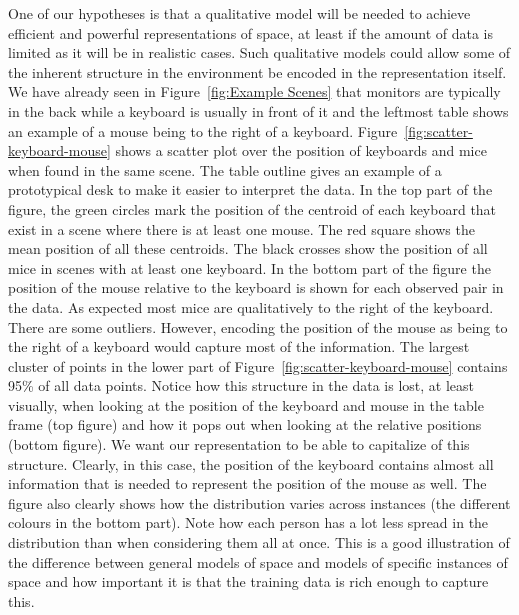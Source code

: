 \documentclass[letterpaper, 10 pt, conference]{ieeeconf}  %
\begin{document}
One of our hypotheses is that a qualitative model will be needed to achieve efficient and powerful representations of 
space, at least if the amount of data is limited as it will be in realistic cases. Such qualitative models could allow some of the inherent 
structure in the environment be encoded in the representation itself. We have already seen in Figure~\ref{fig:Example Scenes} that monitors 
are typically in the back while a keyboard is usually in front of it and the leftmost table shows an example of a mouse being to the right of a keyboard. Figure~\ref{fig:scatter-keyboard-mouse} shows a scatter plot 
over the position of keyboards and mice when found in the same scene. The table outline gives an example of a prototypical desk to make it easier to interpret the data. 
In the top part of the figure, the green circles mark the position of the centroid of each 
keyboard that exist in a scene where there is at least one mouse. The red square shows the mean position of all these centroids. The black 
crosses show the position of all mice in scenes with at least one keyboard. In the bottom part of the figure the position of the mouse 
relative to the keyboard is shown for each observed pair in the data. As expected most mice are qualitatively to the right of the keyboard. There are some outliers. However,  
encoding the position of the mouse as being to the right of a keyboard would capture most of the information. The largest cluster of points in the lower part of Figure~\ref{fig:scatter-keyboard-mouse} contains 95\% 
of all data points. Notice how this structure in the data is lost, at least visually, when looking at the position of the keyboard and mouse in the table frame (top figure) and how it pops out when looking at the relative positions (bottom figure). We want our representation to be able to capitalize of this structure. Clearly, in this case, the position of the keyboard contains almost all information that is needed to represent the position of the mouse as well. The figure also clearly shows how the distribution varies across instances (the different colours in the bottom part). Note how each person has a lot less spread in the distribution than when considering them all at once. This is a good illustration of the difference between general models of space and models of specific instances of space and how important it is that the training data is rich enough to capture this.
\end{document}

